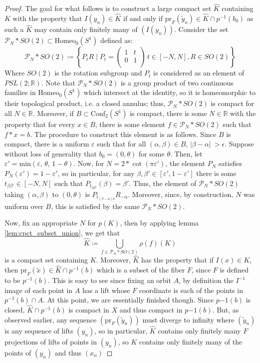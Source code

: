 \documentclass[10pt, oneside]{article}
\newcommand{\R}{\mathbb{R}}
\newcommand{\homeoS}{\text{Homeo}_0(S^1)}
\newcommand{\conf}[1]{\text{Conf}_{#1}(S^1)}
\theoremstyle{definition}
\theoremstyle{definition}
\begin{document}
\begin{proof}
    The goal for what follows is to construct a large compact set $\hat{K}$ containing $K$ with the property that $I(y_n)\in \hat{K}$ if and only if $\text{pr}_F(\tilde{y}_n)\in \hat{K}\cap p^{-1}(b_0)$ as such a $\hat{K}$ may contain only finitely many of $(I(y_n))$. Consider the set $\mathcal{P}_N*SO(2)\subset \homeoS$ defined as:
    $$\mathcal{P}_N*SO(2)\coloneqq \left\{ P_t R \;\vert \;P_t = \begin{pmatrix} 1 & t\\ 0 & 1\\
    \end{pmatrix}\, t\in[-N, N], R\in SO(2)\right\}$$
    Where $SO(2)$ is the rotation subgroup and $P_t$ is considered as an element of $PSL(2;\R)$. Note that $\mathcal{P}_N * SO(2)$ is a group product of two continuous families in $\homeoS$ which intersect at the identity, so it is homeomorphic to their topological product, i.e. a closed annulus; thus, $\mathcal{P}_N*SO(2)$ is compact for all $N\in\R$. Moreover, if $B\subset\conf{2}$ is compact, there is some $N\in \R$ with the property that for every $x\in B$, there is some element $f\in \mathcal{P}_N*SO(2)$ such that $f*x = b$. The procedure to construct this element is as follows. Since $B$ is compact, there is a uniform $\varepsilon$ such that for all $(\alpha, \beta)\in B$, $\lvert\beta - \alpha\rvert\ >\epsilon$. Suppose without loss of generality that $b_0 = (0,\theta)$ for some $\theta$. Then, let $\varepsilon' =\text{min}(\varepsilon,\, \theta,\, 1-\theta)$. Now, for $N=2*\cot(\pi \varepsilon')$, the element $P_N$ satisfies $P_N(\varepsilon') = 1-\varepsilon'$, so in particular, for any $\beta, \beta'\in[\varepsilon', 1-\varepsilon']$ there is some $t_{\beta\beta'}\in[-N, N]$ such that $P_{t_{\beta\beta'}}(\beta) = \beta'$. Thus, the element of $\mathcal{P}_N * SO(2)$ taking $(\alpha, \beta)$ to $(0, \theta)$ is $P_{t_{(\beta-\alpha)\theta}} R_{-\alpha}$. Moreover, since, by construction, $N$ was uniform over $B$, this is satisfied by the same $\mathcal{P}_N*SO(2)$.

    Now, fix an appropriate $N$ for $p(K)$, then by applying lemma \ref{lem:cpct_subset_union}, we get that
    $$\hat{K}\coloneqq \bigcup_{f\in \mathcal{P}_N * SO(2)} \rho(f)(K)$$
    is a compact set containing $K$. Moreover, $\hat{K}$ has the property that if $I(x)\in K$, then $\text{pr}_F(\tilde{x})\in \hat{K}\cap p^{-1}(b)$ which is a subset of the fiber $F$, since $F$ is defined to be $p^{-1}(b)$. This is easy to see since fixing an orbit $A$, by definition the $I^{-1}$ image of each point in $A$ has a lift whose $F$ coordinate is each of the points in $p^{-1}(b)\cap A$. At this point, we are essentially finished though. Since $p{-1}(b)$ is closed, $\hat{K}\cap p^{-1}(b)$ is compact in $X$ and thus compact in $p{-1}(b)$. But, as observed earlier, any sequence $(\text{pr}_F(\tilde{y}_n))$ must diverge to infinity where $(\tilde{y}_n)$ is any sequence of lifts $(y_n)$, so in particular, $\hat{K}$ contains only finitely many $F$ projections of lifts of points in $(y_n)$, so $K$ contains only finitely many of the points of $(y_n)$ and thus $(x_n)$
\end{proof}
\end{document}
